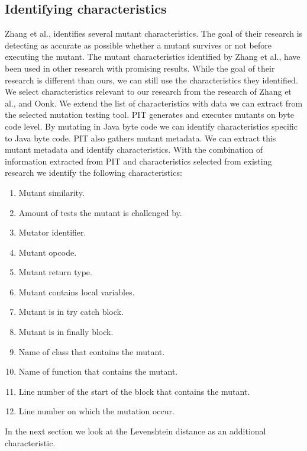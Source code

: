 \documentclass[conference,draftclsnofoot,onecolumn]{IEEEtran}
\begin{document}
\subsection{Identifying characteristics}
\label{ch:identifying_characteristics}
Zhang et al., identifies several mutant characteristics\cite{Zhang2019PredictiveTesting}. 
The goal of their research is detecting as accurate as possible whether a mutant survives or not before executing the mutant.
The mutant characteristics identified by Zhang et al., have been used in other research with promising results\cite{Oonk2021}.
While the goal of their research is different than ours, we can still use the characteristics they identified.
We select characteristics relevant to our research from the research of Zhang et al., and Oonk\cite{Oonk2021}.
We extend the list of characteristics with data we can extract from the selected mutation testing tool. 
\newline
PIT generates and executes mutants on byte code level\cite{pitestBytecode}.
By mutating in Java byte code we can identify characteristics specific to Java byte code.
PIT also gathers mutant metadata.
We can extract this mutant metadata and identify characteristics. 
With the combination of information extracted from PIT and characteristics selected from existing research we identify the following characteristics:
\begin{enumerate}
    \item Mutant similarity.
    \item Amount of tests the mutant is challenged by.
    \item Mutator identifier.
    \item Mutant opcode.
    \item Mutant return type.
    \item Mutant contains local variables.
    \item Mutant is in try catch block.
    \item Mutant is in finally block.
    \item Name of class that contains the mutant.
    \item Name of function that contains the mutant.
    \item Line number of the start of the block that contains the mutant.
    \item Line number on which the mutation occur.
\end{enumerate}

In the next section we look at the Levenshtein distance as an additional characteristic.
\end{document}
